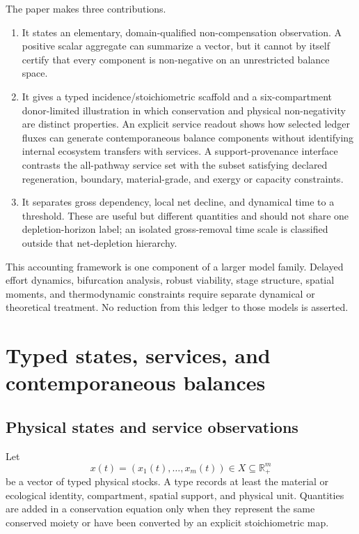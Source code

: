 \documentclass[11pt]{article}
\newcommand{\R}{\mathbb R}
\begin{document}
The paper makes three contributions.

\begin{enumerate}
    \item It states an elementary, domain-qualified non-compensation observation. A positive scalar aggregate can summarize a vector, but it cannot by itself certify that every component is non-negative on an unrestricted balance space.
    \item It gives a typed incidence/stoichiometric scaffold and a six-compartment donor-limited illustration in which conservation and physical non-negativity are distinct properties. An explicit service readout shows how selected ledger fluxes can generate contemporaneous balance components without identifying internal ecosystem transfers with services. A support-provenance interface contrasts the all-pathway service set with the subset satisfying declared regeneration, boundary, material-grade, and exergy or capacity constraints.
    \item It separates gross dependency, local net decline, and dynamical time to a threshold. These are useful but different quantities and should not share one depletion-horizon label; an isolated gross-removal time scale is classified outside that net-depletion hierarchy.
\end{enumerate}

This accounting framework is one component of a larger model family. Delayed effort dynamics, bifurcation analysis, robust viability, stage structure, spatial moments, and thermodynamic constraints require separate dynamical or theoretical treatment. No reduction from this ledger to those models is asserted.

\section{Typed states, services, and contemporaneous balances}

\subsection{Physical states and service observations}

Let
\[
x(t)=(x_1(t),\ldots,x_m(t))\in X\subseteq\R_+^m
\]
be a vector of typed physical stocks. A type records at least the material or ecological identity, compartment, spatial support, and physical unit. Quantities are added in a conservation equation only when they represent the same conserved moiety or have been converted by an explicit stoichiometric map.
\end{document}
